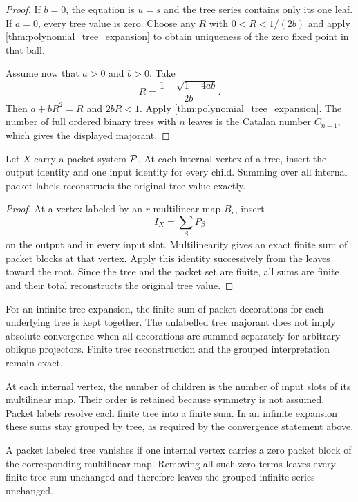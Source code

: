 \begin{proof}
If $b=0$, the equation is $u=s$ and the tree series contains only its one leaf.  If $a=0$, every tree value is zero.  Choose any $R$ with $0<R<1/(2b)$ and apply \cref{thm:polynomial_tree_expansion} to obtain uniqueness of the zero fixed point in that ball.

Assume now that $a>0$ and $b>0$.  Take
\[
R=
\frac{1-\sqrt{1-4ab}}{2b}.
\]
Then $a+bR^2=R$ and $2bR<1$.  Apply \cref{thm:polynomial_tree_expansion}.  The number of full ordered binary trees with $n$ leaves is the Catalan number $C_{n-1}$, which gives the displayed majorant.
\end{proof}

\begin{theorem}\label{thm:packet_tree_reconstruction}
Let $X$ carry a packet system $\mathcal P$.  At each internal vertex of a tree, insert the output identity and one input identity for every child.  Summing over all internal packet labels reconstructs the original tree value exactly.
\end{theorem}

\begin{proof}
At a vertex labeled by an $r$ multilinear map $B_r$, insert
\[
I_X=\sum_\beta P_\beta
\]
on the output and in every input slot.  Multilinearity gives an exact finite sum of packet blocks at that vertex.  Apply this identity successively from the leaves toward the root.  Since the tree and the packet set are finite, all sums are finite and their total reconstructs the original tree value.
\end{proof}

For an infinite tree expansion, the finite sum of packet decorations for each underlying tree is kept together. The unlabelled tree majorant does not imply absolute convergence when all decorations are summed separately for arbitrary oblique projectors. Finite tree reconstruction and the grouped interpretation remain exact.

\begin{interpretation}[title={Arity in a tree}]
At each internal vertex, the number of children is the number of input slots of its multilinear map. Their order is retained because symmetry is not assumed. Packet labels resolve each finite tree into a finite sum. In an infinite expansion these sums stay grouped by tree, as required by the convergence statement above.
\end{interpretation}

\begin{corollary}\label{cor:tree_pruning}
A packet labeled tree vanishes if one internal vertex carries a zero packet block of the corresponding multilinear map.  Removing all such zero terms leaves every finite tree sum unchanged and therefore leaves the grouped infinite series unchanged.
\end{corollary}

